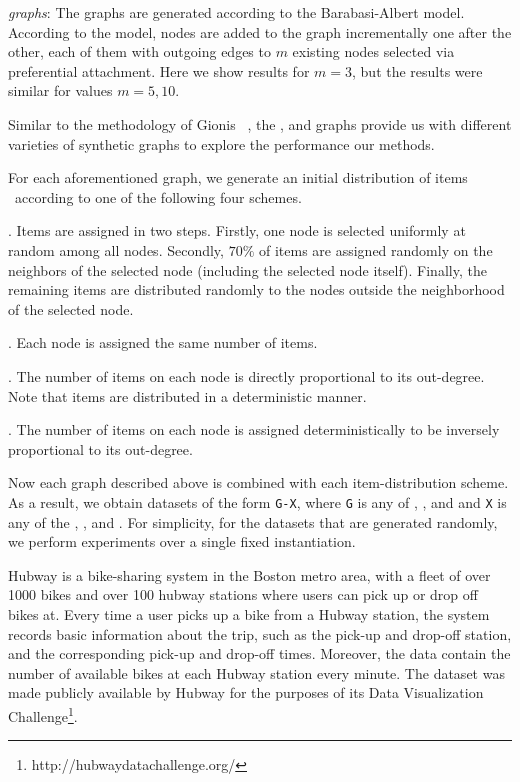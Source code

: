 \emph{{\ba} graphs}: The {\ba} graphs are  generated according to the
Barabasi-Albert model. According to the model,
nodes are added to the graph incrementally one after the other, 
each of them with outgoing edges to $m$ existing nodes selected
via preferential attachment. Here we show results for $m=3$, but the results
were similar for values $m=5,10$. 

Similar to the methodology of Gionis {\etal}~\cite{gionis2015bump}, 
the {\grid}, {\geo} and {\ba} graphs provide us 
with different varieties of synthetic graphs to explore the performance 
our methods.

For each aforementioned graph, we generate an initial distribution
of items \initial\ according to one of the following four schemes.

\squishlist
\item \ego. Items are assigned in two steps. Firstly, one node
	is selected uniformly at random among all nodes. Secondly,
	$70\%$ of items are assigned randomly on the neighbors of the selected node
	(including the selected node itself). Finally, the remaining items
	are distributed randomly to the nodes outside the neighborhood of the 
	selected node.
\item \uniform. Each node is assigned the same number of items.
\item \direct. The number of items on each node is directly proportional to its
	out-degree. Note that items are distributed in a deterministic manner.
\item \inverse. The number of items on each node is assigned deterministically to
	be inversely proportional to its out-degree.
\squishend

Now each graph described above is combined with 
each item-distribution scheme. 
As a result, we obtain datasets of the form {\tt G-X}, where 
{\tt G} is any of {\autonomoussystems}, {\grid},  {\geo} and {\ba} 
and {\tt X} is any of the {\ego}, {\uniform}, {\direct} and {\inverse}.
For simplicity, for the datasets that are generated randomly, 
we perform experiments over a single fixed instantiation.


 Hubway
is a bike-sharing system in the Boston metro area, with a fleet of 
over 1000 bikes and over 100 hubway stations where users can pick up or 
drop off bikes at.
Every time a user picks up a bike from a Hubway station, 
the system records basic
information about the trip, such as the pick-up and drop-off
station, and the corresponding pick-up and drop-off times. 
Moreover, the data contain the number of available bikes
at each Hubway station every minute. 
The dataset was made publicly available by Hubway for the purposes of
its Data Visualization 
Challenge\footnote{http://hubwaydatachallenge.org/}.

